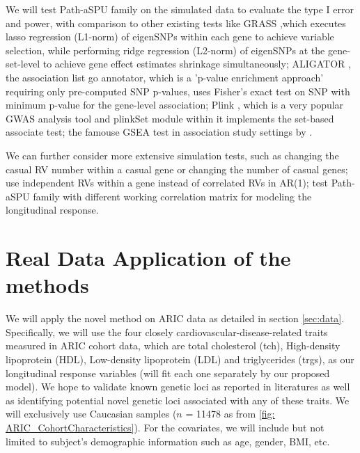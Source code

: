 \documentclass[12pt]{article}
\begin{document}
We will test Path-aSPU family on the simulated data to evaluate the type I error and power, with comparison to other existing tests like GRASS \cite{Chen2010},which executes lasso regression (L1-norm) of eigenSNPs within each gene to achieve variable selection, while performing ridge regression (L2-norm) of eigenSNPs at the gene-set-level to achieve gene effect estimates shrinkage simultaneously; ALIGATOR \cite{Holmans2009}, the association list go annotator, which is a 'p-value enrichment approach' requiring only pre-computed SNP p-values, uses Fisher's exact test on SNP with minimum p-value for the gene-level association; Plink \cite{Purcell2007}, which is a very popular GWAS analysis tool and plinkSet module within it implements the set-based associate test; the famouse GSEA test in association study settings by \cite{wang2007pathway}.

We can further consider more extensive simulation tests, such as changing the casual RV number within a casual gene or changing the number of casual genes; use independent RVs within a gene instead of correlated RVs in AR(1); test Path-aSPU family with different working correlation matrix for modeling the longitudinal response. 


\section{Real Data Application of the methods}\label{sec:subsub1-3}
\label{sec:Data Application}
We will apply the novel method on ARIC data as detailed in section \ref{sec:data}. Specifically, we will use the four closely cardiovascular-disease-related traits measured in ARIC cohort data, which are total cholesterol (tch), High-density lipoprotein (HDL), Low-density lipoprotein (LDL) and triglycerides (trgs), as our longitudinal response variables (will fit each one separately by our proposed model). We hope to validate known genetic loci as reported in literatures \cite{Teslovich2010,Lange2014,Peloso2014,Consortium2013,Maxwell2013} as well as identifying potential novel genetic loci associated with any of these traits. We will exclusively use Caucasian samples ($n$ = 11478 as from \ref{fig: ARIC_CohortCharacteristics}). For the covariates, we will include but not limited to subject's demographic information such as age, gender, BMI, etc. 
\end{document}

